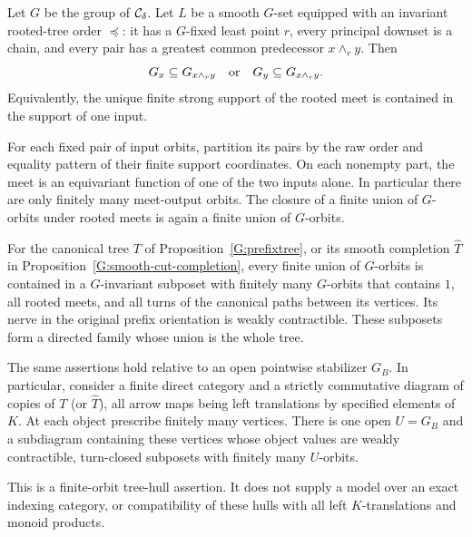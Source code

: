 \begin{proposition}
\label{G:finite-orbit-tree-hulls}
Let $G$ be the group of $\mathcal C_\delta$. Let $L$ be a smooth
$G$-set equipped with an invariant rooted-tree order
$\preceq$: it has a $G$-fixed least point $r$, every principal
downset is a chain, and every pair has a greatest common
predecessor $x\wedge_r y$. Then
\[
 G_x\subseteq G_{x\wedge_r y}
 \quad\hbox{or}\quad
 G_y\subseteq G_{x\wedge_r y}.
\]
Equivalently, the unique finite strong support of the rooted
meet is contained in the support of one input.

For each fixed pair of input orbits, partition its pairs by
the raw order and equality pattern of their finite support
coordinates. On each nonempty part, the meet is an equivariant
function of one of the two inputs alone. In particular there
are only finitely many meet-output orbits. The closure of a
finite union of $G$-orbits under rooted meets is again a finite
union of $G$-orbits.

For the canonical tree $T$ of Proposition~\ref{G:prefixtree},
or its smooth completion $\widehat T$ in
Proposition~\ref{G:smooth-cut-completion}, every finite union
of $G$-orbits is contained in a $G$-invariant subposet with
finitely many $G$-orbits that contains $1$, all rooted meets,
and all turns of the canonical paths between its vertices.
Its nerve in the original prefix orientation is weakly
contractible. These subposets form a directed family whose
union is the whole tree.

The same assertions hold relative to an open pointwise
stabilizer $G_B$. In particular, consider a finite direct
category and a strictly commutative diagram of copies of
$T$ (or $\widehat T$), all arrow maps being left translations
by specified elements of $K$. At each object prescribe
finitely many vertices. There is one open $U=G_B$ and a
subdiagram containing these vertices whose object values
are weakly contractible, turn-closed subposets with finitely
many $U$-orbits.

This is a finite-orbit tree-hull assertion. It does not supply
a model over an exact indexing category, or compatibility of
these hulls with all left $K$-translations and monoid products.
\end{proposition}
